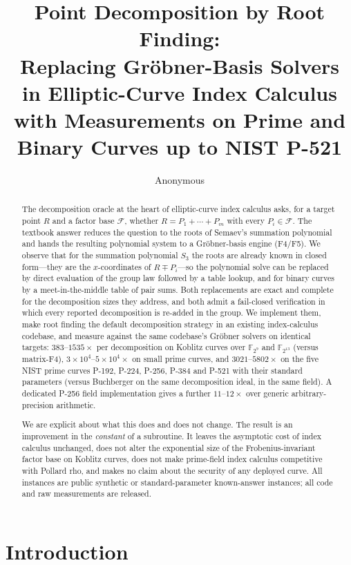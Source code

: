 \documentclass[10pt,a4paper]{article}
\title{Point Decomposition by Root Finding:\\
       Replacing Gr\"obner-Basis Solvers\\
       in Elliptic-Curve Index Calculus\\[4pt]
       {\large with Measurements on Prime and Binary Curves up to NIST P-521}}
\author{Anonymous}
\date{}
\theoremstyle{remark}
\newcommand{\FF}{\mathbb{F}}
\newcommand{\Fb}{\mathcal{F}}
\newcommand{\Sem}[1]{S_{#1}}
\begin{document}
\maketitle

\begin{abstract}
The decomposition oracle at the heart of elliptic-curve index calculus
asks, for a target point $R$ and a factor base $\Fb$, whether
$R = P_1 + \cdots + P_m$ with every $P_i \in \Fb$. The textbook answer
reduces the question to the roots of Semaev's summation polynomial and
hands the resulting polynomial system to a Gr\"obner-basis engine
(F4/F5). We observe that for the summation polynomial $\Sem{3}$ the
roots are already known in closed form---they are the $x$-coordinates of
$R \mp P_i$---so the polynomial solve can be replaced by direct
evaluation of the group law followed by a table lookup, and for binary
curves by a meet-in-the-middle table of pair sums. Both replacements are
exact and complete for the decomposition sizes they address, and both
admit a fail-closed verification in which every reported decomposition
is re-added in the group. We implement them, make root finding the
default decomposition strategy in an existing index-calculus codebase,
and measure against the same codebase's Gr\"obner solvers on identical
targets: $383$--$1535\times$ per decomposition on Koblitz curves over
$\FF_{2^9}$ and $\FF_{2^{13}}$ (versus matrix-F4), $3\times 10^4$--$5\times 10^4\times$
on small prime curves, and $3021$--$5802\times$ on the five NIST prime
curves P-192, P-224, P-256, P-384 and P-521 with their standard
parameters (versus Buchberger on the same decomposition ideal, in the
same field). A dedicated P-256 field implementation gives a further
$11$--$12\times$ over generic arbitrary-precision arithmetic.

We are explicit about what this does and does not change. The result is
an improvement in the \emph{constant} of a subroutine. It leaves the
asymptotic cost of index calculus unchanged, does not alter the
exponential size of the Frobenius-invariant factor base on Koblitz
curves, does not make prime-field index calculus competitive with
Pollard rho, and makes no claim about the security of any deployed
curve. All instances are public synthetic or standard-parameter
known-answer instances; all code and raw measurements are released.
\end{abstract}

\section{Introduction}
\label{sec:intro}
\end{document}
